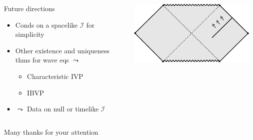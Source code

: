 \documentclass[10pt]{beamer}
\theoremstyle{plain}
\begin{document}
\begin{frame}
\begin{columns}
\begin{block}{Future directions}
\begin{itemize}
       \item Conds on a spacelike $\mathscr{I}$ for simplicity
       \item Other existence and uniqueness thms for wave eqs $\leadsto$
         \begin{itemize}
         \item Characteristic IVP
         \item IBVP
         \end{itemize}
         \item $\leadsto$ Data on null or timelike $\mathscr{I}$
\end{itemize}
     \end{block}
     \begin{center}
\includegraphics[width=1.1\textwidth]{figs/future2.pdf}
\end{center}
  \end{columns}
\end{frame}

\begin{frame}
  \begin{center}
    \Huge{Many thanks for your attention}
    \end{center}

 \end{frame}
\end{document}
